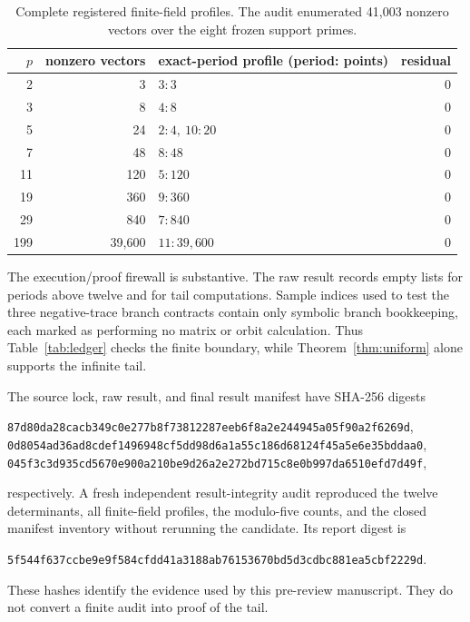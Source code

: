\documentclass[11pt]{article}
\theoremstyle{definition}
\theoremstyle{remark}
\begin{document}
\begin{table}[tbp]
\centering
\caption{Complete registered finite-field profiles.  The audit enumerated
41,003 nonzero vectors over the eight frozen support primes.}
\label{tab:profiles}
\begin{tabular}{@{}r r l r@{}}
\toprule
\(p\) & nonzero vectors & exact-period profile (period: points) & residual \\
\midrule
2   & 3      & \(3:3\)               & 0 \\
3   & 8      & \(4:8\)               & 0 \\
5   & 24     & \(2:4,\ 10:20\)       & 0 \\
7   & 48     & \(8:48\)              & 0 \\
11  & 120    & \(5:120\)             & 0 \\
19  & 360    & \(9:360\)             & 0 \\
29  & 840    & \(7:840\)             & 0 \\
199 & 39,600 & \(11:39{,}600\)       & 0 \\
\bottomrule
\end{tabular}
\end{table}

The execution/proof firewall is substantive.  The raw result records empty
lists for periods above twelve and for tail computations.  Sample indices
used to test the three negative-trace branch contracts contain only symbolic
branch bookkeeping, each marked as performing no matrix or orbit
calculation.  Thus Table~\ref{tab:ledger} checks the finite boundary, while
Theorem~\ref{thm:uniform} alone supports the infinite tail.

The source lock, raw result, and final result manifest have SHA-256 digests
\begin{center}
\footnotesize
\nolinkurl{87d80da28cacb349c0e277b8f73812287eeb6f8a2e244945a05f90a2f6269d},\\
\nolinkurl{0d8054ad36ad8cdef1496948cf5dd98d6a1a55c186d68124f45a5e6e35bddaa0},\\
\nolinkurl{045f3c3d935cd5670e900a210be9d26a2e272bd715c8e0b997da6510efd7d49f},
\end{center}
respectively.  A fresh independent result-integrity audit reproduced the
twelve determinants, all finite-field profiles, the modulo-five counts, and
the closed manifest inventory without rerunning the candidate.  Its report
digest is
\begin{center}
\footnotesize
\nolinkurl{5f544f637ccbe9e9f584cfdd41a3188ab76153670bd5d3cdbc881ea5cbf2229d}.
\end{center}
These hashes identify the evidence used by this pre-review manuscript.  They
do not convert a finite audit into proof of the tail.
\end{document}
